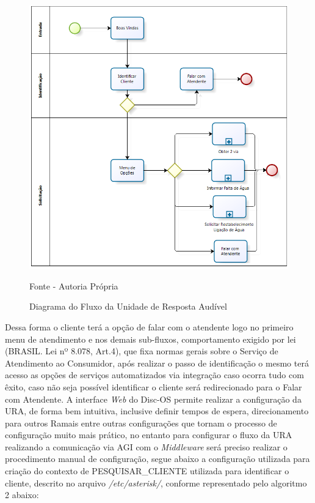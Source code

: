 \begin{figure}[!htb]
	\centering
	\includegraphics{figuras/fluxo_ura.png}
	\caption{Diagrama do Fluxo da Unidade de Resposta Audível}	
	Fonte - Autoria Própria
\end{figure}


Dessa forma o cliente terá a opção de falar com o atendente logo no primeiro menu de atendimento e nos demais sub-fluxos, comportamento exigido por lei (BRASIL. Lei nº 8.078, Art.4), que fixa normas gerais sobre o Serviço de Atendimento ao Consumidor, após realizar o passo de identificação o mesmo terá acesso as opções de serviços automatizados via integração caso ocorra tudo com êxito, caso não seja possível identificar o cliente será redirecionado para o Falar com Atendente.
A interface \textit{Web} do Disc-OS permite realizar a configuração da URA, de forma bem intuitiva, inclusive definir tempos de espera, direcionamento para outros Ramais entre outras configurações que tornam o processo de configuração muito mais prático, no entanto para configurar o fluxo da URA realizando a comunicação via AGI com o \textit{Middleware} será preciso realizar o procedimento manual de configuração, segue abaixo a configuração utilizada para criação do contexto de PESQUISAR\_CLIENTE utilizada para identificar o cliente, descrito no arquivo \textit{/etc/asterisk/}, conforme representado pelo algoritmo 2 abaixo:


